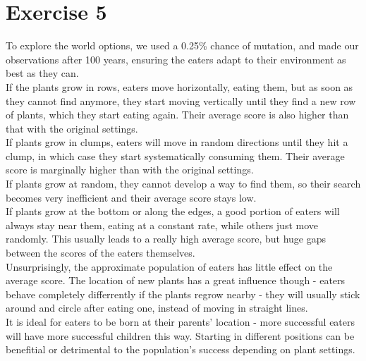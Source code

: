 \documentclass[a4paper,10pt]{article}
\begin{document}
\section*{Exercise 5}
To explore the world options, we used a 0.25\% chance of mutation, and made our observations after 100 years, ensuring the eaters adapt to their environment as best as they can.\\
If the plants grow in rows, eaters move horizontally, eating them, but as soon as they cannot find anymore, they start moving vertically until they find a new row of plants, which they start eating again. Their average score is also higher than that with the original settings.\\
If plants grow in clumps, eaters will move in random directions until they hit a clump, in which case they start systematically consuming them. Their average score is marginally higher than with the original settings.\\
If plants grow at random, they cannot develop a way to find them, so their search becomes very inefficient and their average score stays low.\\
If plants grow at the bottom or along the edges, a good portion of eaters will always stay near them, eating at a constant rate, while others just move randomly. This usually leads to a really high average score, but huge gaps between the scores of the eaters themselves.\\
Unsurprisingly, the approximate population of eaters has little effect on the average score. The location of new plants has a great influence though - eaters behave completely differrently if the plants regrow nearby - they will usually stick around and circle after eating one, instead of moving in straight lines.\\
It is ideal for eaters to be born at their parents' location - more successful eaters will have more successful children this way. Starting in different positions can be benefitial or detrimental to the population's success depending on plant settings.
\end{document}
